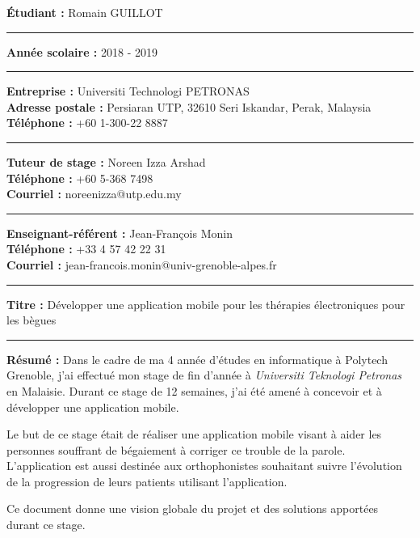 
\clearpage \ifodd\value{page}\hbox{\thispagestyle{empty}}\newpage\fi
\thispagestyle{empty}

\noindent\textbf{Étudiant :} Romain GUILLOT

\noindent\rule{\textwidth}{1pt}

\noindent\textbf{Année scolaire :} 2018 - 2019

\noindent\rule{\textwidth}{1pt}

\noindent\textbf{Entreprise :} Universiti Technologi PETRONAS \\
\noindent\textbf{Adresse postale :} Persiaran UTP, 32610 Seri Iskandar, Perak, Malaysia \\
\noindent\textbf{Téléphone :} +60 1-300-22 8887

\noindent\rule{\textwidth}{1pt}

\noindent\textbf{Tuteur de stage :} Noreen Izza Arshad \\
\noindent\textbf{Téléphone :} +60 5-368 7498\\
\noindent\textbf{Courriel :} noreenizza@utp.edu.my

\noindent\rule{\textwidth}{1pt}

\noindent\textbf{Enseignant-référent :} Jean-François Monin \\
\noindent\textbf{Téléphone :} +33 4 57 42 22 31 \\
\noindent\textbf{Courriel :} jean-francois.monin@univ-grenoble-alpes.fr

\noindent\rule{\textwidth}{1pt}

\noindent\textbf{Titre :} Développer une application mobile pour les thérapies électroniques pour les bègues

\noindent\rule{\textwidth}{1pt}

\noindent\textbf{Résumé :}
Dans le cadre de ma 4 année d'études en informatique à Polytech Grenoble, j'ai effectué mon stage de fin d'année à \textit{Universiti Teknologi Petronas} en Malaisie. Durant ce stage de 12 semaines, j'ai été amené à concevoir et à développer une application mobile.

Le but de ce stage était de réaliser une application mobile visant à aider les personnes souffrant de bégaiement à corriger ce trouble de la parole. L'application est aussi destinée aux orthophonistes souhaitant suivre l'évolution de la progression de leurs patients utilisant l'application.

Ce document donne une vision globale du projet et des solutions apportées durant ce stage.

